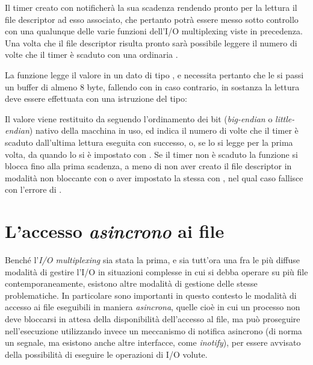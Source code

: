 Il timer creato con  notificherà la sua scadenza
rendendo pronto per la lettura il file descriptor ad esso associato, che
pertanto potrà essere messo sotto controllo con una qualunque delle varie
funzioni dell'I/O multiplexing viste in precedenza. Una volta che il file
descriptor risulta pronto sarà possibile leggere il numero di volte che il
timer è scaduto con una ordinaria . 

La funzione legge il valore in un dato di tipo , e necessita
pertanto che le si passi un buffer di almeno 8 byte, fallendo con
 in caso contrario, in sostanza la lettura deve essere
effettuata con una istruzione del tipo:

Il valore viene restituito da  seguendo l'ordinamento dei bit
(\textit{big-endian} o \textit{little-endian}) nativo della macchina in uso,
ed indica il numero di volte che il timer è scaduto dall'ultima lettura
eseguita con successo, o, se lo si legge per la prima volta, da quando lo si è
impostato con . Se il timer non è scaduto la funzione
si blocca fino alla prima scadenza, a meno di non aver creato il file
descriptor in modalità non bloccante con  o aver
impostato la stessa con , nel qual caso fallisce con l'errore di
.




\section{L'accesso \textsl{asincrono} ai file}
\label{sec:file_asyncronous_operation}

Benché l'\textit{I/O multiplexing} sia stata la prima, e sia tutt'ora una fra
le più diffuse modalità di gestire l'I/O in situazioni complesse in cui si
debba operare su più file contemporaneamente, esistono altre modalità di
gestione delle stesse problematiche. In particolare sono importanti in questo
contesto le modalità di accesso ai file eseguibili in maniera
\textsl{asincrona}, quelle cioè in cui un processo non deve bloccarsi in
attesa della disponibilità dell'accesso al file, ma può proseguire
nell'esecuzione utilizzando invece un meccanismo di notifica asincrono (di
norma un segnale, ma esistono anche altre interfacce, come \textit{inotify}),
per essere avvisato della possibilità di eseguire le operazioni di I/O volute.



